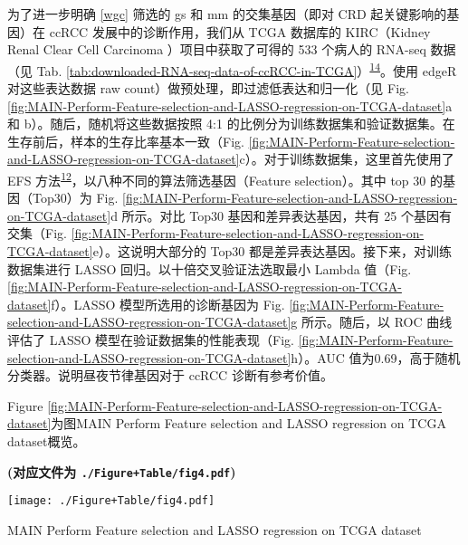 \documentclass[
]{article}
\begin{document}
为了进一步明确 \ref{wgc} 筛选的 gs 和 mm 的交集基因（即对 CRD 起关键影响的基因）在 ccRCC 发展中的诊断作用，我们从 TCGA 数据库的 KIRC（Kidney Renal Clear Cell Carcinoma ）项目中获取了可得的 533 个病人的 RNA-seq 数据（见 Tab. \ref{tab:downloaded-RNA-seq-data-of-ccRCC-in-TCGA}）\textsuperscript{\protect\hyperlink{ref-TcgabiolinksAColapr2015}{14}}。使用 edgeR 对这些表达数据 raw count）做预处理，即过滤低表达和归一化（见 Fig. \ref{fig:MAIN-Perform-Feature-selection-and-LASSO-regression-on-TCGA-dataset}a 和 b）。随后，随机将这些数据按照 4:1 的比例分为训练数据集和验证数据集。在生存前后，样本的生存比率基本一致（Fig. \ref{fig:MAIN-Perform-Feature-selection-and-LASSO-regression-on-TCGA-dataset}c）。对于训练数据集，这里首先使用了 EFS 方法\textsuperscript{\protect\hyperlink{ref-EfsAnEnsemblNeuman2017}{12}}，以八种不同的算法筛选基因（Feature selection）。其中 top 30 的基因（Top30）为 Fig. \ref{fig:MAIN-Perform-Feature-selection-and-LASSO-regression-on-TCGA-dataset}d 所示。对比 Top30 基因和差异表达基因，共有 25 个基因有交集（Fig. \ref{fig:MAIN-Perform-Feature-selection-and-LASSO-regression-on-TCGA-dataset}e）。这说明大部分的 Top30 都是差异表达基因。接下来，对训练数据集进行 LASSO 回归。以十倍交叉验证法选取最小 Lambda 值（Fig. \ref{fig:MAIN-Perform-Feature-selection-and-LASSO-regression-on-TCGA-dataset}f）。LASSO 模型所选用的诊断基因为 Fig. \ref{fig:MAIN-Perform-Feature-selection-and-LASSO-regression-on-TCGA-dataset}g 所示。随后，以 ROC 曲线评估了 LASSO 模型在验证数据集的性能表现（Fig. \ref{fig:MAIN-Perform-Feature-selection-and-LASSO-regression-on-TCGA-dataset}h）。AUC 值为0.69，高于随机分类器。说明昼夜节律基因对于 ccRCC 诊断有参考价值。

Figure \ref{fig:MAIN-Perform-Feature-selection-and-LASSO-regression-on-TCGA-dataset}为图MAIN Perform Feature selection and LASSO regression on TCGA dataset概览。

\textbf{(对应文件为 \texttt{./Figure+Table/fig4.pdf})}

\def\@captype{figure}
\begin{center}
\texttt{[image: ./Figure+Table/fig4.pdf]}
\caption{MAIN Perform Feature selection and LASSO regression on TCGA dataset}\label{fig:MAIN-Perform-Feature-selection-and-LASSO-regression-on-TCGA-dataset}
\end{center}
\end{document}
